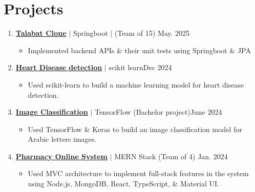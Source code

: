 \documentclass[a4paper,11pt]{article}
\begin{document}
\section{\textbf{Projects}}

\begin{enumerate}

    \item \href{https://github.com/AhmadSafwatt/FinalProject-24-MeskEl5etamInArabic} {\textbf{\color[rgb]{0,0,1} Talabat Clone}} $|$ {Springboot} $|$ (Team of 15) \hfill {May. 2025}
    \   \begin{itemize}
            \item Implemented backend APIs \& their unit tests using Springboot \& JPA
        \end{itemize}



    \item \href{https://github.com/hosain-ghoraba/Heart-Disease-detection} {\textbf{\color[rgb]{0,0,1} Heart Disease detection}} $|$ {scikit learn}\hfill {Dec 2024}
    \   \begin{itemize}
            \item Used scikit-learn to build a machine learning model for heart disease detection.
        \end{itemize}

    \item \href{https://github.com/hosain-ghoraba/dogs-vs-cats} {\textbf{\color[rgb]{0,0,1} Image Classification}} $|$ {TensorFlow (Bachelor project)}\hfill {June 2024}
          \begin{itemize}
              \item Used TensorFlow \& Keras to build an image classification model for Arabic letters images.
          \end{itemize}

    \item \href{https://github.com/advanced-computer-lab-2023/Code-of-Duty2-Pharmacy} {\textbf{\color[rgb]{0,0,1} Pharmacy Online System}} $|$ {MERN Stack} (Team of 4)  \hfill {Jan. 2024}
          \begin{itemize}
              \item Used MVC architecture to implement full-stack features in the system using Node.js, MongoDB, React, TypeScript, \& Material UI.
          \end{itemize}


\end{enumerate}
\end{document}
